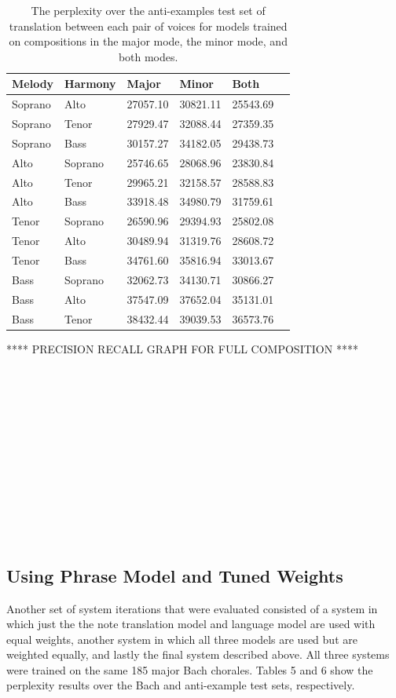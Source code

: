 \documentclass{sig-alternate}
\begin{document}
\begin{table}[h]
  \begin{center}
      \begin{tabular}{| l | l | l | l | l | l |}
      \hline
     Melody & Harmony & Major & Minor & Both \\ \hline
     Soprano & Alto & 27057.10 & 30821.11 & 25543.69 \\ \hline
     Soprano & Tenor & 27929.47 & 32088.44 & 27359.35 \\ \hline
     Soprano & Bass & 30157.27 & 34182.05 & 29438.73 \\ \hline
     Alto & Soprano & 25746.65 & 28068.96 & 23830.84 \\ \hline
     Alto & Tenor & 29965.21 & 32158.57 & 28588.83 \\ \hline
     Alto & Bass & 33918.48 & 34980.79 & 31759.61 \\ \hline
     Tenor & Soprano & 26590.96 & 29394.93 & 25802.08 \\ \hline
     Tenor & Alto & 30489.94 & 31319.76 & 28608.72 \\ \hline
     Tenor & Bass & 34761.60 & 35816.94 & 33013.67 \\ \hline
     Bass & Soprano & 32062.73 & 34130.71 & 30866.27 \\ \hline
     Bass & Alto & 37547.09 & 37652.04 & 35131.01 \\ \hline
     Bass & Tenor & 38432.44 & 39039.53 & 36573.76 \\ \hline
      \end{tabular}
  \end{center}
  \caption{The perplexity over the anti-examples test set of translation between each pair of voices for models trained on compositions in the major mode, the minor mode, and both modes.}
\end{table}

**** PRECISION RECALL GRAPH FOR FULL COMPOSITION ****
\\
\\
\\
\\
\\
\\
\\
\\
\\
\\
\\
\\
\\

\subsection{Using Phrase Model and Tuned Weights}
Another set of system iterations that were evaluated consisted of a system in which just the the note translation model and language model are used with equal weights, another system in which all three models are used but are weighted equally, and lastly the final system described above. All three systems were trained on the same 185 major Bach chorales. Tables 5 and 6 show the perplexity results over the Bach and anti-example test sets, respectively.  
\end{document}
